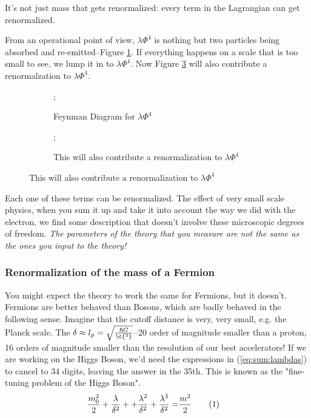 \documentclass[]{article}
\newcommand\numberthis{\addtocounter{equation}{1}\tag{\theequation}}
\begin{document}
It's not just mass that gets renormalized: every term in the Lagrangian can get renormalized.

From an operational point of view, $\lambda \Phi^4$ is nothing but two particles being absorbed and re-emitted--Figure \ref{fig:lambda:phi:4}. If everything happens on a scale that is too small to see, we lump it in to $\lambda \Phi^4$. Now Figure \ref{fig:lambda:phi:4x} will also contribute a renormalzation to $\lambda \Phi^4$.

\begin{figure}[H]
	\begin{center}
		\caption{Renormalization of $\lambda \Phi^4$}
		\begin{subfigure}[t]{0.45\textwidth}
			\caption{Feynman Diagram for $\lambda \Phi^4$}\label{fig:lambda:phi:4}
			;
		\end{subfigure}
		\begin{subfigure}[t]{0.45\textwidth}
			\begin{center}
				\caption{This will also contribute a renormalization to $\lambda \Phi^4$}\label{fig:lambda:phi:4x}
				;
			\end{center}
		\end{subfigure}
	\end{center}
\end{figure}

Each one of these terms can be renormalized. The effect of very small scale physics, when you sum it up and take it into account the way we did with the electron, we find some description that doesn't involve these microscopic degrees of freedom. \emph{The parameters of the theory that you measure are not the same as the ones you input to the theory!}

\subsubsection{Renormalization of the mass of a Fermion}


You might expect the theory to work the same for Fermions, but it doesn't. Fermions are better behaved than Bosons, which are badly behaved in the following sense. Imagine that the cutoff distance is very, very small, e.g. the Planck scale. The $\delta \approx l_p = \sqrt{\frac{\hslash G}{\c{^3}}}$--20 order of magnitude smaller than a proton, 16 orders of magnitude smaller than the resolution of our best accelerators! If we are working on the Higgs Boson, we'd need the expressions in (\ref{eq:sum:lambdas}) to cancel to 34 digits, leaving the answer in the 35th. This is known as the "fine-tuning problem of the Higgs Boson".
\begin{align*}
	\frac{m_0^2}{2} + \frac{\lambda}{\delta^2} +  + \frac{\lambda^2}{\delta^2}  + \frac{\lambda^3}{\delta^2} =& \frac{m^2}{2}\numberthis\label{eq:sum:lambdas}
\end{align*}
\end{document}

